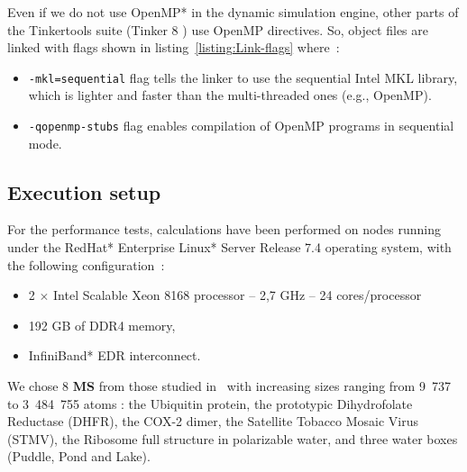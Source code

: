 \documentclass[9pt,comparison]{livecoms}
\newcommand{\lv}{\Large\verb}
\begin{document}
Even if we do not use OpenMP*\cite{openmp} in the dynamic simulation engine, other parts of the Tinkertools suite (Tinker 8 \cite{Tinker8})  use OpenMP directives. So, object files are linked with flags shown in listing~\ref{listing:Link-flags} where~:
\begin{itemize}
    \item {\color{codepurple}\lv|-mkl=sequential|} flag tells the linker to use the sequential Intel MKL library, which is lighter and faster than the multi-threaded ones (e.g., OpenMP).
    \item {\color{codepurple}\lv|-qopenmp-stubs|} flag enables compilation of OpenMP programs in sequential mode. 
\end{itemize}


\subsection{Execution setup}
\hspace{\parindent}For the performance tests, calculations have been performed on nodes running under the RedHat* Enterprise Linux* Server Release 7.4 operating system, with the following configuration~:
\begin{itemize}
    \item 2 $\times$ Intel Scalable Xeon 8168 processor -- 2,7 GHz -- 24 cores/processor
    \item 192 GB of DDR4 memory,
    \item InfiniBand* EDR interconnect.
\end{itemize}

We chose 8 \textbf{MS} from those studied in~\cite{Tinker-HP} with increasing sizes ranging from 9~737 to 3~484~755 atoms : the Ubiquitin protein, the prototypic Dihydrofolate Reductase (DHFR), the COX-2 dimer, the Satellite Tobacco Mosaic Virus (STMV), the Ribosome full structure in polarizable water, and three water boxes (Puddle, Pond and Lake). 
\end{document}
